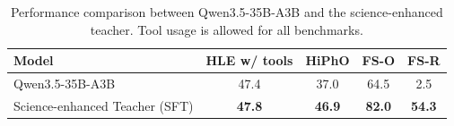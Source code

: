 \begin{table}[]
\footnotesize
\centering
\setlength{\tabcolsep}{8pt}
\renewcommand{\arraystretch}{1.4}
\caption{Performance comparison between Qwen3.5-35B-A3B and the science-enhanced teacher. Tool usage is allowed for all benchmarks.}
\label{tab:sci-enhanced-teacher}
\begin{tabular}{lcccc}
\midrule
Model & HLE w/ tools  & HiPhO & FS-O & FS-R \\ 
\midrule
Qwen3.5-35B-A3B & 47.4 & 37.0  & 64.5 & 2.5  \\
Science-enhanced Teacher (SFT) & \textbf{47.8} & \textbf{46.9} & \textbf{82.0} & \textbf{54.3} \\ 
\midrule
\end{tabular}
\end{table}